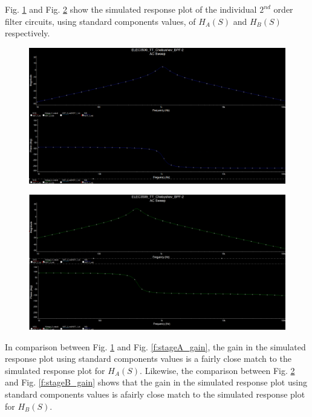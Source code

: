 \documentclass[hidelinks]{article}
\begin{document}
	\pagebreak	
	\noindent Fig. \ref{f:stageA_gain_stand} and Fig. \ref{f:stageB_gain_stand} show the simulated response plot of the individual $2^{nd}$ order filter circuits, using standard components values, of $H_A(S)$ and $H_B(S)$ respectively.
	\begin{figure}[htbp]
		\centering
		\includegraphics[width=0.6\textheight]{stageA_gain_stand.png}
		\label{f:stageA_gain_stand}
	\end{figure}	
	\begin{figure}[htbp]
		\centering
		\includegraphics[width=0.6\textheight]{stageB_gain_stand.png}
		\label{f:stageB_gain_stand}
	\end{figure}	
	
	\noindent In comparison between Fig. \ref{f:stageA_gain_stand} and Fig. \ref{f:stageA_gain}, the gain in the simulated response plot using standard components values is a fairly close match to the simulated response plot for $H_A(S)$. 
	Likewise, the comparison between Fig. \ref{f:stageB_gain_stand} and Fig. \ref{f:stageB_gain} shows that the gain in the simulated response plot using standard components values is afairly close match to the simulated response plot for $H_B(S)$.
\end{document}
